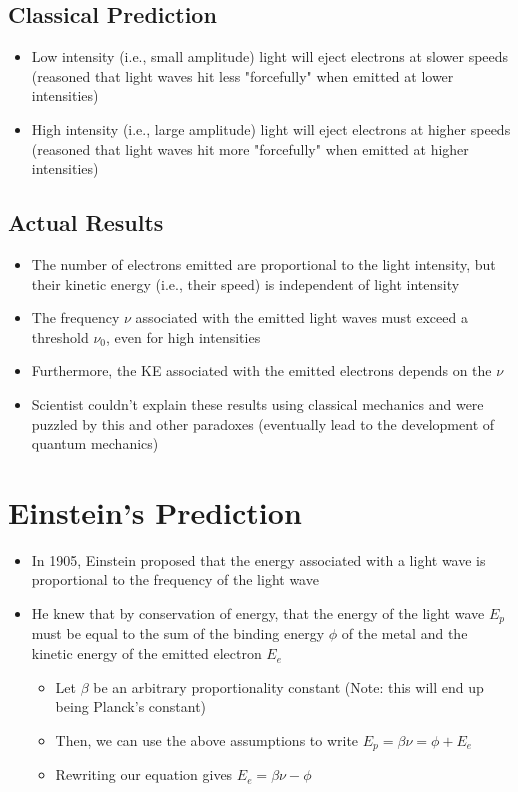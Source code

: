 \documentclass[a4paper]{article}
\begin{document}
	\subsection*{Classical Prediction}	
		\begin{itemize}
			\item Low intensity (i.e., small amplitude) light will eject electrons at slower speeds (reasoned that light waves hit less "forcefully" when emitted at lower intensities)
			\item High intensity (i.e., large amplitude) light will eject electrons at higher speeds (reasoned that light waves hit more "forcefully" when emitted at higher intensities)
		\end{itemize}
	\subsection*{Actual Results}		
		\begin{itemize}
			\item The number of electrons emitted are proportional to the light intensity, but their kinetic energy (i.e., their speed) is independent of light intensity 
			\item The frequency $\nu$ associated with the emitted light waves must exceed a threshold $\nu_0$, even for high intensities 
			\item Furthermore, the KE associated with the emitted electrons depends on the $\nu$ 
			\item Scientist couldn't explain these results using classical mechanics and were puzzled by this and other paradoxes (eventually lead to the development of quantum mechanics)
		\end{itemize}
	\section*{Einstein's Prediction}
		\begin{itemize}
			\item In 1905, Einstein proposed that the energy associated with a light wave is proportional to the frequency of the light wave 
			\item He knew that by conservation of energy, that the energy of the light wave $E_p$ must be equal to the sum of the binding energy $\phi$ of the metal and the kinetic energy of the emitted electron $E_e$ 
				\begin{itemize}
					\item Let $\beta$ be an arbitrary proportionality constant (Note: this will end up being Planck's constant)
					\item Then, we can use the above assumptions to write $E_p = \beta \nu = \phi + E_e$
					\item Rewriting our equation gives $\boxed{E_e = \beta \nu - \phi}$
				\end{itemize}
		\end{itemize}			
\end{document}

